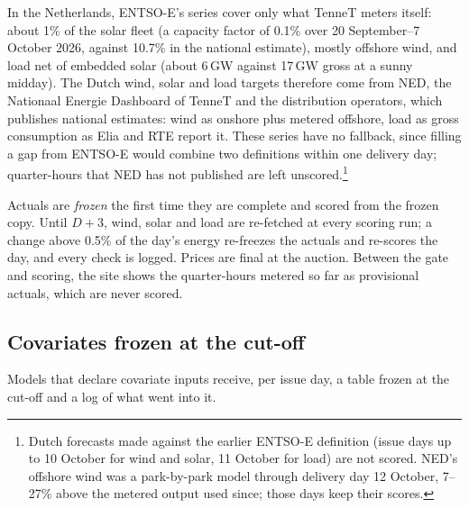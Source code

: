 \documentclass[11pt,a4paper]{article}
\begin{document}
In the Netherlands, ENTSO-E's series cover only what TenneT meters itself: about 1\% of the solar fleet (a capacity
factor of 0.1\% over 20 September--7 October 2026, against 10.7\% in the national estimate), mostly offshore wind, and
load net of embedded solar (about 6\,GW against 17\,GW gross at a sunny midday). The Dutch wind, solar and load
targets therefore come from NED, the Nationaal Energie Dashboard of TenneT and the distribution operators, which
publishes national estimates: wind as onshore plus metered offshore, load as gross consumption as Elia and RTE report
it. These series have no fallback, since filling a gap from ENTSO-E would combine two definitions within one delivery
day; quarter-hours that NED has not published are left unscored.\footnote{Dutch forecasts made against the earlier
ENTSO-E definition (issue days up to 10 October for wind and solar, 11 October for load) are not scored. NED's offshore
wind was a park-by-park model through delivery day 12 October, 7--27\% above the metered output used since; those days
keep their scores.}

Actuals are \emph{frozen} the first time they are complete and scored from the frozen copy. Until $D+3$, wind, solar
and load are re-fetched at every scoring run; a change above 0.5\% of the day's energy re-freezes the
actuals and re-scores the day, and every check is logged. Prices are final at the auction. Between the gate and
scoring, the site shows the quarter-hours metered so far as provisional actuals, which are never scored.

\subsection{Covariates frozen at the cut-off}
\label{sec:cov}

Models that declare covariate inputs receive, per issue day, a table frozen at the cut-off and a log of what went
into it.
\end{document}
